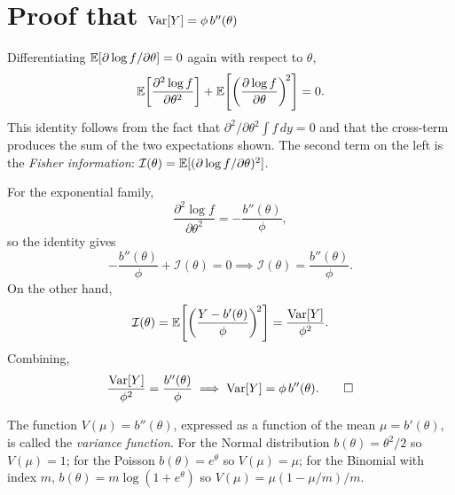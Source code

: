 \section*{Proof that $\mathrm{Var}[Y] = \phi\,b''(\theta)$}

Differentiating $\mathbb{E}[\partial\log f/\partial\theta] = 0$ again with
respect to $\theta$,
\[
  \mathbb{E}\!\left[\frac{\partial^2 \log f}{\partial\theta^2}\right]
  + \mathbb{E}\!\left[\left(\frac{\partial\log f}{\partial\theta}\right)^{\!2}\right]
  = 0.
\]
This identity follows from the fact that
$\partial^2/\partial\theta^2 \int f\,dy = 0$ and that the cross-term
produces the sum of the two expectations shown.  The second term on the
left is the \emph{Fisher information}:
$\mathcal{I}(\theta) = \mathbb{E}[(\partial\log f/\partial\theta)^2]$.

For the exponential family,
\[
  \frac{\partial^2\log f}{\partial\theta^2} = -\frac{b''(\theta)}{\phi},
\]
so the identity gives
\[
  -\frac{b''(\theta)}{\phi} + \mathcal{I}(\theta) = 0
  \implies
  \mathcal{I}(\theta) = \frac{b''(\theta)}{\phi}.
\]
On the other hand,
\[
  \mathcal{I}(\theta)
  = \mathbb{E}\!\left[\left(\frac{Y-b'(\theta)}{\phi}\right)^{\!2}\right]
  = \frac{\mathrm{Var}[Y]}{\phi^2}.
\]
Combining,
\[
  \frac{\mathrm{Var}[Y]}{\phi^2} = \frac{b''(\theta)}{\phi}
  \implies
  \mathrm{Var}[Y] = \phi\,b''(\theta). \qquad\square
\]

\begin{remark}
  The function $V(\mu) = b''(\theta)$, expressed as a function of the
  mean $\mu = b'(\theta)$, is called the \emph{variance function}.
  For the Normal distribution $b(\theta)=\theta^2/2$ so $V(\mu)=1$;
  for the Poisson $b(\theta)=e^\theta$ so $V(\mu)=\mu$; for the
  Binomial with index $m$, $b(\theta)=m\log(1+e^\theta)$ so
  $V(\mu)=\mu(1-\mu/m)/m$.
\end{remark}


